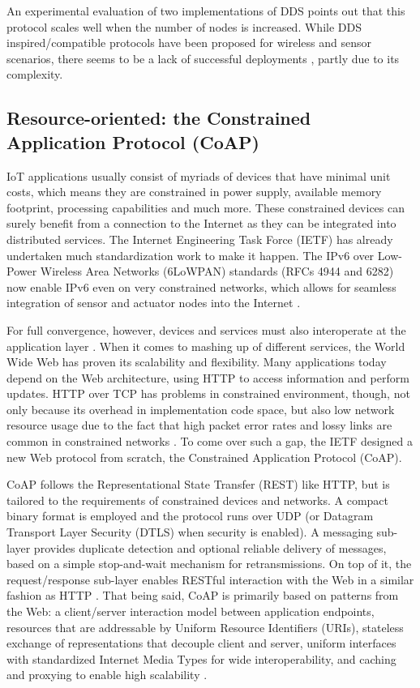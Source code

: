 An experimental evaluation of two implementations of DDS \cite{4536566} points out that this protocol scales well when the number of nodes is increased. While DDS inspired/compatible protocols have been proposed for wireless and sensor scenarios, there seems to be a lack of successful deployments \cite{7396558}, partly due to its complexity. 

\subsection{Resource-oriented: the Constrained Application Protocol (CoAP)}

IoT applications usually consist of myriads of devices that have minimal unit costs, which means they are constrained in power supply, available memory footprint, processing capabilities and much more. These constrained devices can surely benefit from a connection to the Internet as they can be integrated into distributed services. The Internet Engineering Task Force (IETF) has already undertaken much standardization work to make it happen. The IPv6 over Low-Power Wireless Area Networks (6LoWPAN) standards (RFCs 4944 and 6282) now enable IPv6 even on very constrained networks, which allows for seamless integration of sensor and actuator nodes into the Internet \cite{6159216}. 

For full convergence, however, devices and services must also interoperate at the application layer \cite{kovatsch2014californium}. When it comes to mashing up of different services, the World Wide Web has proven its scalability and flexibility. Many applications today depend on the Web architecture, using HTTP to access information and perform updates. HTTP over TCP has problems in constrained environment, though, not only because its overhead in implementation code space, but also low network resource usage due to the fact that high packet error rates and lossy links are common in constrained networks \cite{6159216}. To come over such a gap, the IETF designed a new Web protocol from scratch, the Constrained Application Protocol (CoAP). 

CoAP follows the Representational State Transfer (REST) \cite{fielding2000architectural} like HTTP, but is tailored to the requirements of constrained devices and networks. A compact binary format is employed and the protocol runs over UDP (or Datagram Transport Layer Security (DTLS) when security is enabled). A messaging sub-layer provides duplicate detection and optional reliable delivery of messages, based on a simple stop-and-wait mechanism for retransmissions. On top of it, the request/response sub-layer enables RESTful interaction with the Web in a similar fashion as HTTP \cite{kovatsch2014californium}. That being said, CoAP is primarily based on patterns from the Web: a client/server interaction model between application endpoints, resources that are addressable by Uniform Resource Identifiers (URIs), stateless exchange of representations that decouple client and server, uniform interfaces with standardized Internet Media Types for wide interoperability, and caching and proxying to enable high scalability \cite{kovatsch2015scalable}. 

